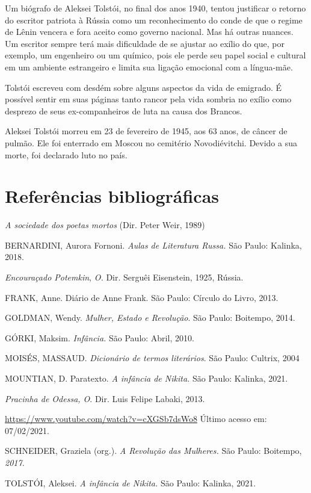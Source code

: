 \documentclass{article}
\begin{document}
Um biógrafo de Aleksei Tolstói, no final dos anos 1940, tentou
justificar o retorno do escritor patriota à Rússia como um
reconhecimento do conde de que o regime de Lênin vencera e fora aceito
como governo nacional. Mas há outras nuances. Um escritor sempre terá
mais dificuldade de se ajustar ao exílio do que, por exemplo, um
engenheiro ou um químico, pois ele perde seu papel social e cultural em
um ambiente estrangeiro e limita sua ligação emocional com a língua-mãe.

Tolstói escreveu com desdém sobre alguns aspectos da vida de emigrado. É
possível sentir em suas páginas tanto rancor pela vida sombria no exílio
como desprezo de seus ex-companheiros de luta na causa dos Brancos.

Aleksei Tolstói morreu em 23 de fevereiro de 1945, aos 63 anos, de
câncer de pulmão. Ele foi enterrado em Moscou no cemitério
Novodiévitchi. Devido a sua morte, foi declarado luto no país.

\section{Referências bibliográficas}

\emph{A sociedade dos poetas mortos} (Dir. Peter Weir, 1989)

BERNARDINI, Aurora Fornoni. \emph{Aulas de Literatura Russa.} São Paulo:
Kalinka, 2018.

\emph{Encouraçado Potemkin}, \emph{O.} Dir. Serguêi Eisenstein, 1925,
Rússia.

FRANK, Anne. Diário de Anne Frank. São Paulo: Círculo do Livro, 2013.

GOLDMAN, Wendy. \emph{Mulher, Estado e Revolução}. São Paulo: Boitempo,
2014.

GÓRKI, Maksim. \emph{Infância.} São Paulo: Abril, 2010.

MOISÉS, MASSAUD. \emph{Dicionário de termos literários}. São Paulo:
Cultrix, 2004

MOUNTIAN, D. Paratexto. \emph{A infância de Nikita.} São Paulo: Kalinka,
2021.

\emph{Pracinha de Odessa, O}. Dir. Luis Felipe Labaki, 2013.

\url{https://www.youtube.com/watch?v=cXGSb7dsWo8} Último acesso em: 07/02/2021.

SCHNEIDER, Graziela (org.). \emph{A Revolução das Mulheres.} São Paulo:
Boitempo, \emph{2017.}

TOLSTÓI, Aleksei. \emph{A infância de Nikita.} São Paulo: Kalinka, 2021.
\end{document}

